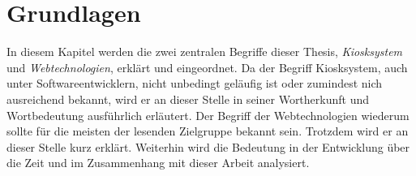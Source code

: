 \chapter{Grundlagen}
\label{chap:grundlagen}

In diesem Kapitel werden die zwei zentralen Begriffe dieser Thesis, \emph{Kiosksystem} und
\emph{Webtechnologien}, erklärt und eingeordnet. Da der Begriff
Kiosksystem, auch unter Softwareentwicklern, nicht unbedingt geläufig ist oder
zumindest nich ausreichend bekannt, wird er an dieser Stelle in seiner Wortherkunft
und Wortbedeutung ausführlich erläutert. Der Begriff der Webtechnologien wiederum sollte
für die meisten der lesenden Zielgruppe bekannt sein. 
Trotzdem wird er an dieser Stelle kurz erklärt. Weiterhin wird die Bedeutung in der Entwicklung 
über die Zeit und im Zusammenhang mit dieser Arbeit analysiert.


